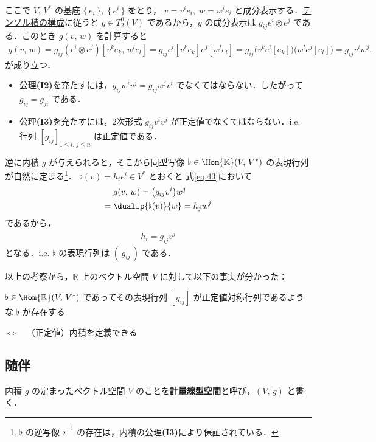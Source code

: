 \documentclass[geometry_main]{subfiles}
\begin{document}
ここで $V,\, V^*$ の基底 $\{\, e_i\, \},\; \{\, e^i \, \}$ をとり， $v = v^i e_i,\; w = w^i e_i$ と成分表示する．\hyperref[prop:tensor-multillinear]{テンソル積の構成}に従うと $g \in T^0_2(V)$ であるから，$g$ の成分表示は $g_{ij} e^i \otimes e^j$ である．このとき $g(v,\, w)$ を計算すると
\begin{align} 
	\label{eq.43}
	g(v,\, w) = g_{ij} (e^i \otimes e^j) [v^k e_k,\, w^l e_l] = g_{ij}  e^i[v^k e_k] e^j[w^l e_l] = g_{ij} \bigl( v^k e^i[e_k] \bigr) \bigl( w^l e^j[e_l] \bigr) = g_{ij} v^i w^j.
\end{align}
が成り立つ．
\begin{itemize} 
	\item 公理\textbf{(I2)}を充たすには，$g_{ij} w^i v^j = g_{ij} w^j v^i$ でなくてはならない．したがって $g_{ij} = g_{ji}$ である．
	\item 公理\textbf{(I3)}を充たすには，2次形式 $g_{ij} v^i v^j$ が正定値でなくてはならない．i.e. 行列 $[g_{ij}]_{1\le i,\, j \le n}$ は正定値である．
\end{itemize}

逆に内積 $g$ が与えられると，そこから同型写像 $\flat \in \Hom{\mathbb{K}}(V,\, V^*)$ の表現行列が自然に定まる\footnote{$\flat$ の逆写像 $\flat^{-1}$ の存在は，内積の公理\textbf{(I3)}により保証されている．}．
$\flat(v) = h_i e^i \in V^*$ とおくと
式\eqref{eq.43}において
\begin{align} 
		&g(v,\, w) = \bigl( g_{ij} v^i \bigr) w^j \\
	=\; &\dualip{\flat(v)}{w} = h_j w^j
\end{align}
であるから，
\begin{align}
	h_i = g_{ij} v^j
\end{align}
となる．i.e. $\flat$ の表現行列は $(\, g_{ij}\, )$ である．

以上の考察から，$\mathbb{R}$ 上のベクトル空間 $V$ に対して以下の事実が分かった：
\begin{tcolorbox} 
	$\flat \in \Hom{\mathbb{R}} (V,\, V^*)$ であってその表現行列 $[g_{ij}]$ が正定値対称行列であるような $\flat$ が存在する
	
	$\Longleftrightarrow\quad$（正定値）内積を定義できる
\end{tcolorbox}

\subsection{随伴}

内積 $g$ の定まったベクトル空間 $V$ のことを\textbf{計量線型空間}と呼び，$(V,\, g)$ と書く．
\end{document}
